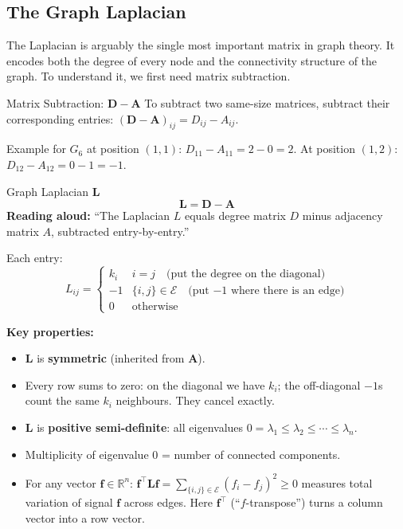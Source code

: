 \subsection{The Graph Laplacian}

The Laplacian is arguably the single most important matrix in graph theory. It encodes both the degree of every node and the connectivity structure of the graph. To understand it, we first need matrix subtraction.

\begin{conceptbox}{Matrix Subtraction: $\mathbf{D} - \mathbf{A}$}
To subtract two same-size matrices, subtract their corresponding entries:
$(\mathbf{D} - \mathbf{A})_{ij} = D_{ij} - A_{ij}$.

Example for $G_6$ at position $(1,1)$: $D_{11} - A_{11} = 2 - 0 = 2$.
At position $(1,2)$: $D_{12} - A_{12} = 0 - 1 = -1$.
\end{conceptbox}

\begin{mathbox}{Graph Laplacian $\mathbf{L}$}
\[
\mathbf{L} = \mathbf{D} - \mathbf{A}
\]
\textbf{Reading aloud:} ``The Laplacian $L$ equals degree matrix $D$ minus adjacency matrix $A$, subtracted entry-by-entry.''

Each entry:
\[
L_{ij} = \begin{cases}
k_i & i = j \quad \text{(put the degree on the diagonal)}\\
-1  & \{i,j\} \in \mathcal{E} \quad \text{(put $-1$ where there is an edge)}\\
0   & \text{otherwise}
\end{cases}
\]

\textbf{Key properties:}
\begin{itemize}[noitemsep]
    \item $\mathbf{L}$ is \textbf{symmetric} (inherited from $\mathbf{A}$).
    \item Every row sums to zero: on the diagonal we have $k_i$; the off-diagonal $-1$s count the same $k_i$ neighbours. They cancel exactly.
    \item $\mathbf{L}$ is \textbf{positive semi-definite}: all eigenvalues $0 = \lambda_1 \leq \lambda_2 \leq \cdots \leq \lambda_n$.
    \item Multiplicity of eigenvalue $0$ = number of connected components.
    \item For any vector $\mathbf{f} \in \mathbb{R}^n$: $\mathbf{f}^\top \mathbf{L} \mathbf{f} = \sum_{\{i,j\} \in \mathcal{E}} (f_i - f_j)^2 \geq 0$ measures total variation of signal $\mathbf{f}$ across edges. Here $\mathbf{f}^\top$ (``$f$-transpose'') turns a column vector into a row vector.
\end{itemize}
\end{mathbox}

